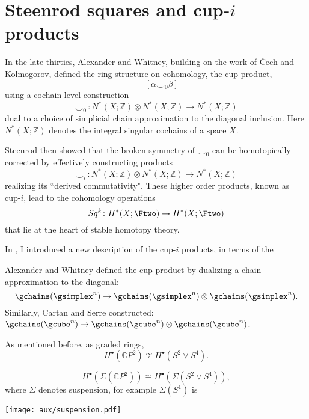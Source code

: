 
\section{Steenrod squares and cup-$i$ products}

In the late thirties, Alexander and Whitney, building on the work of \v{C}ech and Kolmogorov, defined the ring structure on cohomology, the cup product,
\begin{equation*}
[\alpha] [\beta] = [\alpha \smallsmile_{0} \beta]
\end{equation*}
using a cochain level construction
\begin{equation*}
\smallsmile_0 \, \colon N^*(X; \mathbb Z) \otimes N^*(X; \mathbb Z) \to N^*(X; \mathbb Z)
\end{equation*}
dual to a choice of simplicial chain approximation to the diagonal inclusion.
Here $N^*(X; \mathbb Z)$ denotes the integral singular cochains of a space $X$.

Steenrod \cite{steenrod1947products} then showed that the broken symmetry of $\smallsmile_0$ can be homotopically corrected by effectively constructing products
\begin{equation*}
\smallsmile_i\, \colon N^*(X; \mathbb Z) \otimes N^*(X; \mathbb Z) \to N^*(X; \mathbb Z)
\end{equation*}
realizing its ``derived commutativity".
These higher order products, known as cup-$i$, lead to the cohomology operations
\begin{equation*}
Sq^k \colon H^*(X; \Ftwo) \to H^{*}(X; \Ftwo)
\end{equation*}
that lie at the heart of stable homotopy theory.

In \cite{medina2021newformulas}, I introduced a new description of the cup-$i$ products, in terms of the




Alexander and Whitney defined the cup product by dualizing a chain approximation to the diagonal:
\[
\gchains(\gsimplex^n) \to \gchains(\gsimplex^n) \otimes \gchains(\gsimplex^n).
\]
Similarly, Cartan and Serre constructed: $\gchains(\gcube^n) \to \gchains(\gcube^n) \otimes \gchains(\gcube^n)$.

As mentioned before, as graded rings,
\[
H^\bullet(\mathbb{C} P^2) \not\cong H^\bullet(S^2 \vee S^4).
\]

\[
H^\bullet(\Sigma(\mathbb{C} P^2)) \cong H^\bullet(\Sigma(S^2 \vee S^4)),
\]
where $\Sigma$ denotes suspension, for example $\Sigma(S^1)$ is
\begin{center}
	\texttt{[image: aux/suspension.pdf]}
\end{center}

